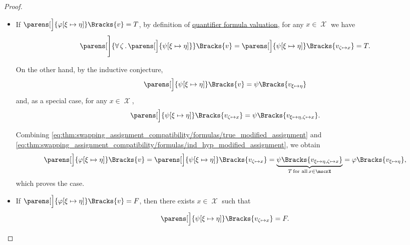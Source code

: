 \begin{proof}
\begin{itemize}
\begin{itemize}
      \begin{itemize}
        \item If \( \parens[\Big]{\varphi[\xi \mapsto \eta]}\Bracks{v} = T \), by definition of \hyperref[def:first_order_valuation/formula_valuation]{quantifier formula valuation}, for any \( x \in \mscrX \) we have
        \begin{equation}\label{eq:thm:swapping_assignment_compatibility/formulas/true_modified_assignment}
          \parens[\Bigg]{\qforall{\zeta} \parens[\Big]{ \psi[\xi \mapsto \eta] }}\Bracks{v}
          =
          \parens[\Big]{\psi[\xi \mapsto \eta]}\Bracks{v_{\zeta \mapsto x}}
          =
          T.
        \end{equation}

        On the other hand, by the inductive conjecture,
        \begin{equation*}
          \parens[\Big]{ \psi[\xi \mapsto \eta] }\Bracks{v} = \psi\Bracks{v_{\xi \mapsto \eta}}
        \end{equation*}
        and, as a special case, for any \( x \in \mscrX \),
        \begin{equation}\label{eq:thm:swapping_assignment_compatibility/formulas/ind_hyp_modified_assignment}
          \parens[\Big]{ \psi[\xi \mapsto \eta] }\Bracks{v_{\zeta \mapsto x}} = \psi\Bracks{v_{\xi \mapsto \eta, \zeta \mapsto x}}.
        \end{equation}

        Combining \eqref{eq:thm:swapping_assignment_compatibility/formulas/true_modified_assignment} and \eqref{eq:thm:swapping_assignment_compatibility/formulas/ind_hyp_modified_assignment}, we obtain
        \begin{equation*}
          \parens[\Big]{ \varphi[\xi \mapsto \eta] }\Bracks{v}
          =
          \parens[\Big]{ \psi[\xi \mapsto \eta] }\Bracks{v_{\zeta \mapsto x}}
          =
          \underbrace{\psi\Bracks{v_{\xi \mapsto \eta, \zeta \mapsto x}}}_{T \T{for all} x \in \mscrX}
          =
          \varphi\Bracks{v_{\xi \mapsto \eta}},
        \end{equation*}
        which proves the case.

        \item If \( \parens[\Big]{\varphi[\xi \mapsto \eta]}\Bracks{v} = F \), then there exists \( x \in \mscrX \) such that
        \begin{equation*}
          \parens[\Big]{\psi[\xi \mapsto \eta]}\Bracks{v_{\zeta \mapsto x}} = F.
        \end{equation*}


\end{itemize}
\end{itemize}
\end{itemize}
\end{proof}
